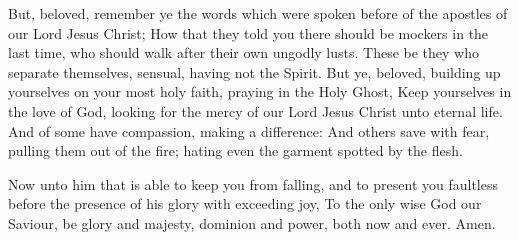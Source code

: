  But, beloved, remember ye the words which were spoken
before of the apostles of our Lord Jesus Christ;  How that
they told you there should be mockers in the last time, who should walk
after their own ungodly lusts.  These be they who separate
themselves, sensual, having not the Spirit.  But ye,
beloved, building up yourselves on your most holy faith, praying in the
Holy Ghost,  Keep yourselves in the love of God, looking
for the mercy of our Lord Jesus Christ unto eternal life. 
And of some have compassion, making a difference:  And
others save with fear, pulling them out of the fire; hating even the
garment spotted by the flesh.

 Now unto him that is able to keep you from falling, and to
present you faultless before the presence of his glory with exceeding
joy,  To the only wise God our Saviour, be glory and
majesty, dominion and power, both now and ever. Amen.

